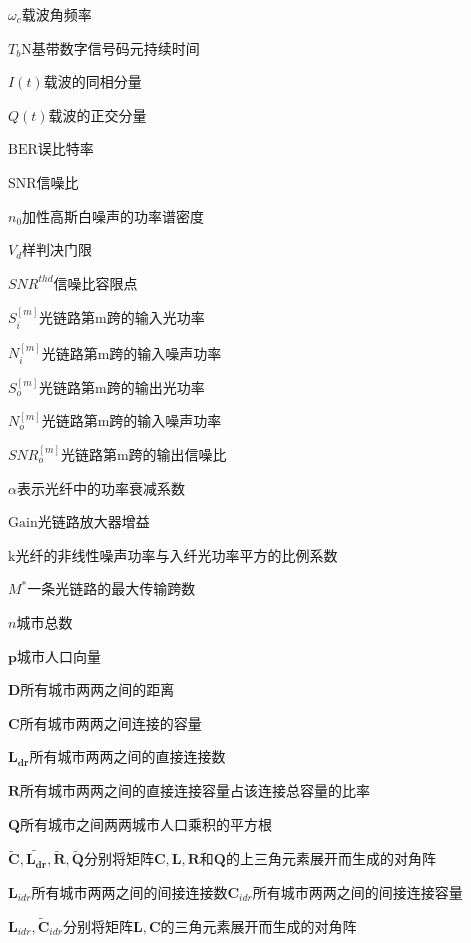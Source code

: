\documentclass[bwprint]{gmcmthesis}
\numberwithin{equation}{section}
\begin{document}
\begin{multicols}{2}
	$\omega_{c}$\quad 载波角频率
	
	$T_{b}$\quad N基带数字信号码元持续时间
	
	$I(t)$\quad 载波的同相分量
	
	$Q(t)$\quad 载波的正交分量
	
	$\mathrm{BER}$\quad 误比特率
	
	$\mathrm{SNR}$\quad 信噪比
	
	$n_{0}$\quad 加性高斯白噪声的功率谱密度
	
	$V_{d}$\quad 样判决门限
	
	$SNR^{thd}$\quad 信噪比容限点
	
	$S_{i}^{[m]}$\quad 光链路第m跨的输入光功率
	
	$N_{i}^{[m]}$\quad 光链路第m跨的输入噪声功率
	
	$S_{o}^{[m]}$\quad 光链路第m跨的输出光功率
	
	$N_{o}^{[m]}$\quad 光链路第m跨的输入噪声功率
	
	$SNR_{o}^{[m]}$\quad 光链路第m跨的输出信噪比
	
	$\alpha$\quad 表示光纤中的功率衰减系数
	
	$\mathrm{Gain}$\quad 光链路放大器增益
	
	$\mathrm{k}$\quad 光纤的非线性噪声功率与入纤光功率平方的比例系数
	
	$M^{*}$\quad 一条光链路的最大传输跨数
	
	$n$\quad 城市总数
	
	$\bm{p}$\quad 城市人口向量
	
	$\bm{D}$\quad 所有城市两两之间的距离
	
	$\bm{C}$\quad 所有城市两两之间连接的容量
	
	$\bm{L_{dr}}$\quad 所有城市两两之间的直接连接数
	
	$\bm{R}$\quad 所有城市两两之间的直接连接容量占该连接总容量的比率
	
	$\bm{Q}$\quad 所有城市之间两两城市人口乘积的平方根
	
	$\bm{\widetilde{C},\widetilde{L_{dr}}, \widetilde{R}, \widetilde{Q}}$分别将矩阵$\bm{C,L,R}$和$\bm{Q}$的上三角元素展开而生成的对角阵
		
	$\boldsymbol{L}_{i d r}$\quad 所有城市两两之间的间接连接数$\boldsymbol{C}_{i d r}$所有城市两两之间的间接连接容量
	

	$\boldsymbol{L}_{i d r}, \widetilde{\boldsymbol{C}}_{i d r}$\quad 分别将矩阵$\boldsymbol{L}, \boldsymbol{C}$的三角元素展开而生成的对角阵


\end{multicols}
\end{document}

